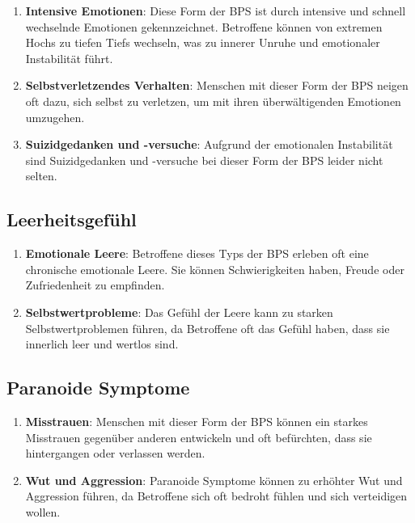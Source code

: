 \begin{enumerate}
\item \textbf{Intensive Emotionen}: Diese Form der BPS ist durch intensive und schnell wechselnde Emotionen gekennzeichnet. Betroffene können von extremen Hochs zu tiefen Tiefs wechseln, was zu innerer Unruhe und emotionaler Instabilität führt.

\item \textbf{Selbstverletzendes Verhalten}: Menschen mit dieser Form der BPS neigen oft dazu, sich selbst zu verletzen, um mit ihren überwältigenden Emotionen umzugehen.

\item \textbf{Suizidgedanken und -versuche}: Aufgrund der emotionalen Instabilität sind Suizidgedanken und -versuche bei dieser Form der BPS leider nicht selten.
\end{enumerate}

\subsection{Leerheitsgefühl}

\begin{enumerate}
\item \textbf{Emotionale Leere}: Betroffene dieses Typs der BPS erleben oft eine chronische emotionale Leere. Sie können Schwierigkeiten haben, Freude oder Zufriedenheit zu empfinden.

\item \textbf{Selbstwertprobleme}: Das Gefühl der Leere kann zu starken Selbstwertproblemen führen, da Betroffene oft das Gefühl haben, dass sie innerlich leer und wertlos sind.
\end{enumerate}

\subsection{Paranoide Symptome}

\begin{enumerate}
\item \textbf{Misstrauen}: Menschen mit dieser Form der BPS können ein starkes Misstrauen gegenüber anderen entwickeln und oft befürchten, dass sie hintergangen oder verlassen werden.

\item \textbf{Wut und Aggression}: Paranoide Symptome können zu erhöhter Wut und Aggression führen, da Betroffene sich oft bedroht fühlen und sich verteidigen wollen.
\end{enumerate}

